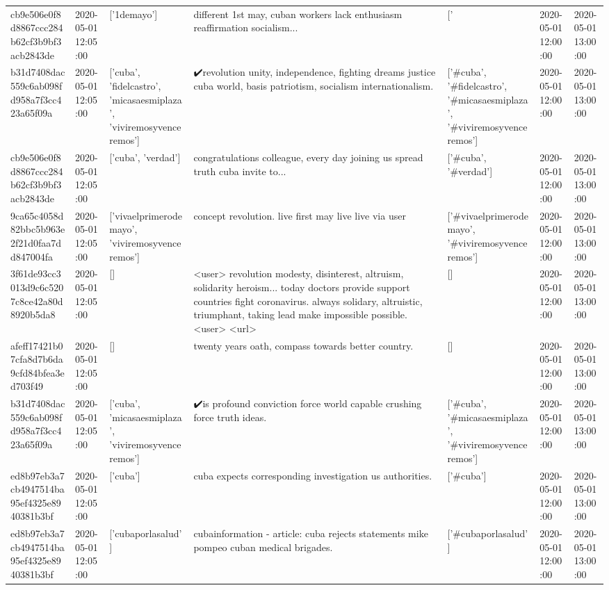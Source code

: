 \begin{tabular}{lllllll}
cb9e506e0f8d8867ccc284b62cf3b9bf3acb2843de & 2020-05-01 12:05:00 & ['1demayo'] & different 1st may, cuban workers lack enthusiasm reaffirmation socialism... & ['#1demayo'] & 2020-05-01 12:00:00 & 2020-05-01 13:00:00 \\
b31d7408dac559c6ab098fd958a7f3cc423a65f09a & 2020-05-01 12:05:00 & ['cuba', 'fidelcastro', 'micasaesmiplaza', 'viviremosyvenceremos'] & ✔️revolution unity, independence, fighting dreams justice cuba world, basis patriotism, socialism internationalism. & ['#cuba', '#fidelcastro', '#micasaesmiplaza', '#viviremosyvenceremos'] & 2020-05-01 12:00:00 & 2020-05-01 13:00:00 \\
cb9e506e0f8d8867ccc284b62cf3b9bf3acb2843de & 2020-05-01 12:05:00 & ['cuba', 'verdad'] & congratulations colleague, every day joining us spread truth cuba invite to... & ['#cuba', '#verdad'] & 2020-05-01 12:00:00 & 2020-05-01 13:00:00 \\
9ca65c4058d82bbc5b963e2f21d0faa7dd847004fa & 2020-05-01 12:05:00 & ['vivaelprimerodemayo', 'viviremosyvenceremos'] & concept revolution. live first may live live via user & ['#vivaelprimerodemayo', '#viviremosyvenceremos'] & 2020-05-01 12:00:00 & 2020-05-01 13:00:00 \\
3f61de93cc3013d9c6c5207c8ce42a80d8920b5da8 & 2020-05-01 12:05:00 & [] & <user> revolution modesty, disinterest, altruism, solidarity heroism... today doctors provide support countries fight coronavirus. always solidary, altruistic, triumphant, taking lead make impossible possible. <user> <url> & [] & 2020-05-01 12:00:00 & 2020-05-01 13:00:00 \\
afeff17421b07cfa8d7b6da9cfd84bfea3ed703f49 & 2020-05-01 12:05:00 & [] & twenty years oath, compass towards better country. & [] & 2020-05-01 12:00:00 & 2020-05-01 13:00:00 \\
b31d7408dac559c6ab098fd958a7f3cc423a65f09a & 2020-05-01 12:05:00 & ['cuba', 'micasaesmiplaza', 'viviremosyvenceremos'] & ✔️is profound conviction force world capable crushing force truth ideas. & ['#cuba', '#micasaesmiplaza', '#viviremosyvenceremos'] & 2020-05-01 12:00:00 & 2020-05-01 13:00:00 \\
ed8b97eb3a7cb4947514ba95ef4325e8940381b3bf & 2020-05-01 12:05:00 & ['cuba'] & cuba expects corresponding investigation us authorities. & ['#cuba'] & 2020-05-01 12:00:00 & 2020-05-01 13:00:00 \\
ed8b97eb3a7cb4947514ba95ef4325e8940381b3bf & 2020-05-01 12:05:00 & ['cubaporlasalud'] & cubainformation - article: cuba rejects statements mike pompeo cuban medical brigades. & ['#cubaporlasalud'] & 2020-05-01 12:00:00 & 2020-05-01 13:00:00 \\

\end{tabular}
